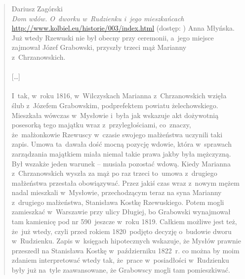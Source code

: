 \begin{quote}{Dariusz Zagórski \\ \null\hfill \emph{Dom wdów. O~dworku 
    w~Rudzienku i~jego mieszkańcach} \\ \null\hfill 
    \url{http://www.kolbiel.eu/historie/003/index.html} (dostęp: \miesiacrokdwa)}
{Anna Młyńska. Już wtedy Rzewuski nie był obecny przy ceremonii, a~jego 
miejsce zajmował Józef Grabowski, przyszły trzeci mąż Marianny
z~Chrzanowskich.
\\
\\
{[}\dots{]}
\\
\\
I~tak, w~roku 1816, w~Wilczyskach Marianna z~Chrzanowskich wzięła ślub 
z~Józefem Grabowskim, podprefektem powiatu żelechowskiego. Mieszkała wówczas 
w~Mysłowie i~była jak wskazuje akt dożywotnią posesorką tego majątku wraz 
z~przyległościami, co~znaczy, że~małżonkowie Rzewuscy w~czasie swojego 
małżeństwa uczynili taki zapis. Umowa ta~dawała dość mocną pozycję wdowie, 
która w~sprawach zarządzania majątkiem miała niemal takie prawa jakby była 
mężczyzną. Był wszakże jeden warunek – musiała pozostać wdową. Kiedy Marianna 
z~Chrzanowskich wyszła za mąż po raz trzeci to~umowa z~drugiego małżeństwa 
przestała obowiązywać. Przez jakiś czas wraz z~nowym mężem nadal mieszkali 
w~Mysłowie, przechodzącym teraz na syna Marianny z~drugiego małżeństwa, 
Stanisława Kostkę Rzewuskiego. Potem mogli zamieszkać w~Warszawie przy ulicy 
Długiej, bo Grabowski wynajmował tam kamienicę pod nr 590~jeszcze w~roku 
1819. Całkiem możliwe jest też, że~już wtedy, czyli przed rokiem 1820~podjęto 
decyzję o~budowie dworu w~Rudzienku. Zapis w~księgach hipotecznych wskazuje, 
że Mysłów prawnie przeszedł na Stanisława Kostkę w~październiku 1822~r. co 
można by moim zdaniem interpretować wtedy tak, że~prace w~posiadłości 
w~Rudzienku były już na~tyle zaawansowane, że Grabowscy mogli tam 
pomieszkiwać.}
\end{quote}


